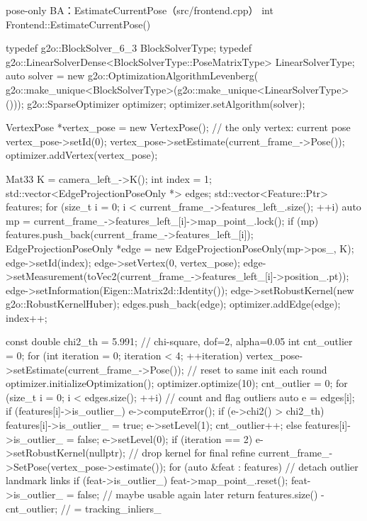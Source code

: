 \begin{codebox}[C++]{pose-only BA：EstimateCurrentPose（src/frontend.cpp）}
int Frontend::EstimateCurrentPose() {
    typedef g2o::BlockSolver_6_3 BlockSolverType;
    typedef g2o::LinearSolverDense<BlockSolverType::PoseMatrixType> LinearSolverType;
    auto solver = new g2o::OptimizationAlgorithmLevenberg(
        g2o::make_unique<BlockSolverType>(g2o::make_unique<LinearSolverType>()));
    g2o::SparseOptimizer optimizer;
    optimizer.setAlgorithm(solver);

    VertexPose *vertex_pose = new VertexPose();   // the only vertex: current pose
    vertex_pose->setId(0);
    vertex_pose->setEstimate(current_frame_->Pose());
    optimizer.addVertex(vertex_pose);

    Mat33 K = camera_left_->K();
    int index = 1;
    std::vector<EdgeProjectionPoseOnly *> edges;
    std::vector<Feature::Ptr> features;
    for (size_t i = 0; i < current_frame_->features_left_.size(); ++i) {
        auto mp = current_frame_->features_left_[i]->map_point_.lock();
        if (mp) {
            features.push_back(current_frame_->features_left_[i]);
            EdgeProjectionPoseOnly *edge = new EdgeProjectionPoseOnly(mp->pos_, K);
            edge->setId(index);
            edge->setVertex(0, vertex_pose);
            edge->setMeasurement(toVec2(current_frame_->features_left_[i]->position_.pt));
            edge->setInformation(Eigen::Matrix2d::Identity());
            edge->setRobustKernel(new g2o::RobustKernelHuber);
            edges.push_back(edge);
            optimizer.addEdge(edge);
            index++;
        }
    }

    const double chi2_th = 5.991;                 // chi-square, dof=2, alpha=0.05
    int cnt_outlier = 0;
    for (int iteration = 0; iteration < 4; ++iteration) {
        vertex_pose->setEstimate(current_frame_->Pose());  // reset to same init each round
        optimizer.initializeOptimization();
        optimizer.optimize(10);
        cnt_outlier = 0;
        for (size_t i = 0; i < edges.size(); ++i) {        // count and flag outliers
            auto e = edges[i];
            if (features[i]->is_outlier_) e->computeError();
            if (e->chi2() > chi2_th) {
                features[i]->is_outlier_ = true;  e->setLevel(1); cnt_outlier++;
            } else {
                features[i]->is_outlier_ = false; e->setLevel(0);
            }
            if (iteration == 2) e->setRobustKernel(nullptr); // drop kernel for final refine
        }
    }
    current_frame_->SetPose(vertex_pose->estimate());
    for (auto &feat : features) {                  // detach outlier landmark links
        if (feat->is_outlier_) {
            feat->map_point_.reset();
            feat->is_outlier_ = false;             // maybe usable again later
        }
    }
    return features.size() - cnt_outlier;          // = tracking_inliers_
}
\end{codebox}

